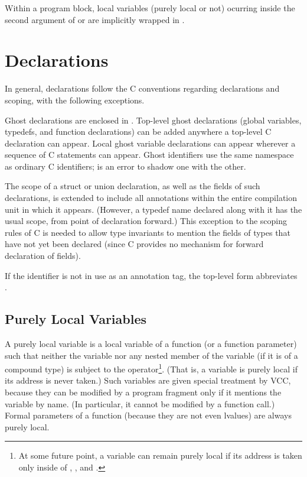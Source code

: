\documentclass[preprint,nocopyrightspace]{sigplanconf}
\begin{document}
{{{\begin{VCC}
Within a program block, local variables (purely local or not) ocurring
inside the second argument of \vcc{\claims} or  are
implicitly wrapped in .

\section{Declarations}
In general, declarations follow the C conventions regarding
declarations and scoping, with the following exceptions. 

Ghost declarations are enclosed in .  Top-level ghost
declarations (global variables, typedefs, and function declarations)
can be added anywhere a top-level C declaration can appear. Local
ghost variable declarations can appear wherever a sequence of C
statements can appear.  Ghost identifiers use the same namespace as
ordinary C identifiers; is an error to shadow one with the other.

The scope of a struct or union declaration, as well as the fields of
such declarations, is extended to include all annotations within the
entire compilation unit in which it appears. (However, a typedef name
declared along with it has the usual scope, from point of declaration
forward.) This exception to the scoping rules of C is needed to allow
type invariants to mention the fields of types that have not yet been
declared (since C provides no mechanism for forward declaration of
fields).

If the identifier  is not in use as an annotation tag, the
top-level form  abbreviates .

\subsection{Purely Local Variables}
A purely local variable is a local variable of a function (or a
function parameter) such that neither the variable nor any nested
member of the variable (if it is of a compound type) is subject to
the \vcc{&} operator\footnote{
At some future point, a variable can remain purely local if its
address is taken only inside of , , and .
}. (That is, a variable is purely local if its
address is never taken.) Such variables are given special treatment
by VCC, because they can be modified by a program fragment only if it
mentions the variable by name. (In particular, it cannot be modified
by a function call.) Formal parameters of a function (because they are not even
lvalues) are always purely local. 


\end{VCC}}}}
\end{document}
